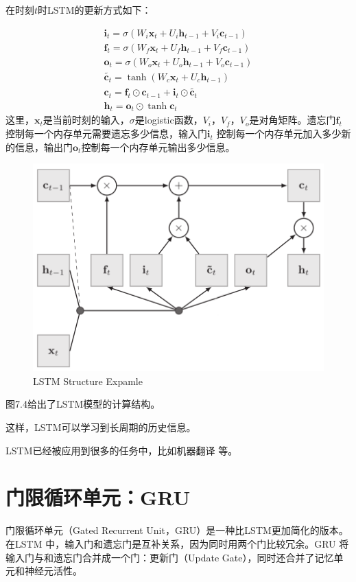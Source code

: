 \documentclass[11pt,fleqn, UTF8]{ctexbook} %
\begin{document}
在时刻$t$时LSTM的更新方式如下：

\begin{gather}\label{7.14}
  \boldsymbol{i}_t=\sigma(W_i\boldsymbol{x}_t+U_i\boldsymbol{h}_{t-1}+V_i\boldsymbol{c}_{t-1}) \\
  \boldsymbol{f}_t=\sigma(W_f\boldsymbol{x}_t+U_f\boldsymbol{h}_{t-1}+V_f\boldsymbol{c}_{t-1})\\
  \boldsymbol{o}_t=\sigma(W_o\boldsymbol{x}_t+U_o\boldsymbol{h}_{t-1}+V_o\boldsymbol{c}_{t-1})\\
  \widetilde{\boldsymbol{c}_t}=\tanh(W_c\boldsymbol{x}_t+U_c\boldsymbol{h}_{t-1})\\
  \boldsymbol{c}_t=\boldsymbol{f}_t\odot \boldsymbol{c}_{t-1}+\boldsymbol{i}_t\odot \widetilde{\boldsymbol{c}_t}\\
  \boldsymbol{h}_t=\boldsymbol{o}_t\odot\tanh{\boldsymbol{c}_t}
\end{gather}
这里，$\boldsymbol{x}_t$是当前时刻的输入，$\sigma$是logistic函数，$V_i$，$V_f$，$V_o$是对角矩阵。遗忘门$\boldsymbol{f}_t$控制每一个内存单元需要遗忘多少信息，输入门$\boldsymbol{i}_t$ 控制每一个内存单元加入多少新的信息，输出门$\boldsymbol{o}_t$控制每一个内存单元输出多少信息。
\begin{figure}[t]
 \centering
 \includegraphics{pics/74.png}
 \caption{LSTM Structure Expamle}
 \label{fig:7.4}
\end{figure}

图7.4给出了LSTM模型的计算结构。

这样，LSTM可以学习到长周期的历史信息。

LSTM已经被应用到很多的任务中，比如机器翻译\cite{sutskever2014sequence} 等。
\section{门限循环单元：GRU}
门限循环单元（Gated Recurrent Unit，GRU）\cite{cho2014learning,chung2014empirical}是一种比LSTM更加简化的版本。在LSTM 中，输入门和遗忘门是互补关系，因为同时用两个门比较冗余。GRU 将输入门与和遗忘门合并成一个门：更新门（Update Gate），同时还合并了记忆单元和神经元活性。
\end{document}
